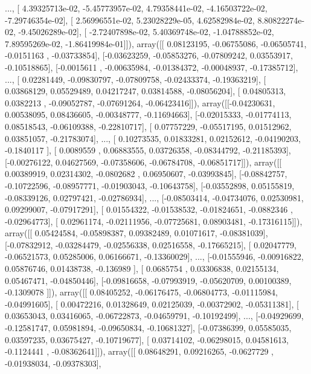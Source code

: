 \documentclass{article}
\begin{document}
       ..., 
       [  4.39325713e-02,  -5.45773957e-02,   4.79358441e-02,
         -4.16503722e-02,  -7.29746354e-02],
       [  2.56996551e-02,   5.23028229e-05,   4.62582984e-02,
          8.80822274e-02,  -9.45026289e-02],
       [ -2.72407898e-02,   5.40369748e-02,  -1.04788852e-02,
          7.89595269e-02,  -1.86419984e-01]]), array([[ 0.08123195, -0.06755086, -0.06505741, -0.0151163 , -0.03733854],
       [-0.03623259, -0.05853276, -0.07809242,  0.03553917, -0.10518865],
       [-0.0015611 , -0.00635984, -0.01384372, -0.00048937, -0.17385712],
       ..., 
       [ 0.02281449, -0.09830797, -0.07809758, -0.02433374, -0.19363219],
       [ 0.03868129,  0.05529489,  0.04217247,  0.03814588, -0.08056204],
       [ 0.04805313,  0.0382213 , -0.09052787, -0.07691264, -0.06423416]]), array([[-0.04230631,  0.00538095,  0.08436605, -0.00348777, -0.11694663],
       [-0.02015333, -0.01774113,  0.08518543, -0.06109388, -0.22810717],
       [ 0.07757229, -0.05517195,  0.01512962,  0.03851057, -0.21783074],
       ..., 
       [ 0.10273535,  0.01833281,  0.02152612, -0.04190203, -0.1840117 ],
       [ 0.0089559 ,  0.06883555,  0.03726358, -0.08344792, -0.21185393],
       [-0.00276122,  0.04627569, -0.07358606, -0.06784708, -0.06851717]]), array([[ 0.00389919,  0.02314302, -0.0802682 ,  0.06950607, -0.03993845],
       [-0.08842757, -0.10722596, -0.08957771, -0.01903043, -0.10643758],
       [-0.03552898,  0.05155819, -0.08339126,  0.02797421, -0.02786934],
       ..., 
       [-0.08503414, -0.04734076,  0.02530981,  0.09299007, -0.07917291],
       [ 0.01554322, -0.01538532, -0.01824651, -0.0882346 , -0.02964773],
       [ 0.02961174, -0.02111956, -0.07725681,  0.08903481, -0.17316115]]), array([[ 0.05424584, -0.05898387,  0.09382489,  0.01071617, -0.08381039],
       [-0.07832912, -0.03284479, -0.02556338,  0.02516558, -0.17665215],
       [ 0.02047779, -0.06521573,  0.05285006,  0.06166671, -0.13360029],
       ..., 
       [-0.01555946, -0.00916822,  0.05876746,  0.01438738, -0.136989  ],
       [ 0.0685754 ,  0.03306838,  0.02155134,  0.05467471, -0.04850446],
       [-0.09816658, -0.07993919, -0.05620709,  0.00100389, -0.1309078 ]]), array([[ 0.08405252, -0.06176475, -0.06804773, -0.01115984, -0.04991605],
       [ 0.00472216,  0.01328649,  0.02125039, -0.00372902, -0.05311381],
       [ 0.03653043,  0.03416065, -0.06722873, -0.04659791, -0.10192499],
       ..., 
       [-0.04929699, -0.12581747,  0.05981894, -0.09650834, -0.10681327],
       [-0.07386399,  0.05585035,  0.03597235,  0.03675427, -0.10719677],
       [ 0.03714102, -0.06298015,  0.04581613, -0.1124441 , -0.08362641]]), array([[ 0.08648291,  0.09216265, -0.0627729 , -0.01938034, -0.09378303],
\end{document}
